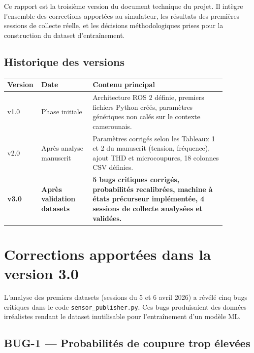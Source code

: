 \documentclass[12pt,a4paper]{article}
\begin{document}
Ce rapport est la troisième version du document technique du projet.
Il intègre l'ensemble des corrections apportées au simulateur, les
résultats des premières sessions de collecte réelle, et les décisions
méthodologiques prises pour la construction du dataset d'entraînement.

\subsection{Historique des versions}

\begin{center}
\begin{tabular}{p{0.08\linewidth} p{0.22\linewidth} p{0.58\linewidth}}
\toprule
\textbf{Version} & \textbf{Date} & \textbf{Contenu principal} \\
\midrule
v1.0 & Phase initiale &
  Architecture ROS 2 définie, premiers fichiers Python créés,
  paramètres génériques non calés sur le contexte camerounais. \\
v2.0 & Après analyse manuscrit &
  Paramètres corrigés selon les Tableaux 1 et 2 du manuscrit
  (tension, fréquence), ajout THD et microcoupures,
  18 colonnes CSV définies. \\
\textbf{v3.0} & \textbf{Après validation datasets} &
  \textbf{5 bugs critiques corrigés, probabilités recalibrées,
  machine à états précurseur implémentée, 4 sessions de collecte
  analysées et validées.} \\
\bottomrule
\end{tabular}
\end{center}

\section{Corrections apportées dans la version 3.0}
\label{sec:corrections}

L'analyse des premiers datasets (sessions du 5 et 6 avril 2026) a
révélé cinq bugs critiques dans le code \texttt{sensor\_publisher.py}.
Ces bugs produisaient des données irréalistes rendant le dataset
inutilisable pour l'entraînement d'un modèle ML.

\subsection{BUG-1 — Probabilités de coupure trop élevées}
\end{document}
